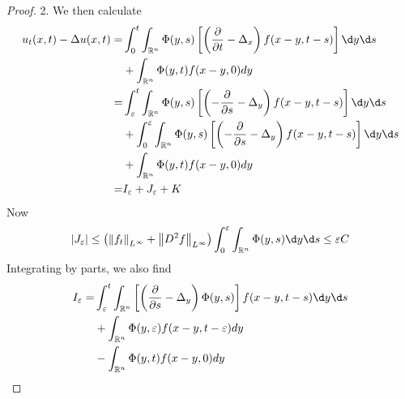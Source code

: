 \begin{theorem}
\begin{proof}
        2. We then calculate
        \begin{equation*}
            \begin{aligned}
                u_t(x, t)-\Delta u(x, t)= & \int_0^t \int_{\mathbb{R}^n} \Phi(y, s)\left[\left(\frac{\partial}{\partial t}-\Delta_x\right) f(x-y, t-s)\right] \d y \d s               \\
                                          & +\int_{\mathbb{R}^n} \Phi(y, t) f(x-y, 0) d y                                                                                             \\
                =                         & \int_{\varepsilon}^t \int_{\mathbb{R}^n} \Phi(y, s)\left[\left(-\frac{\partial}{\partial s}-\Delta_y\right) f(x-y, t-s)\right] \d y \d s  \\
                                          & +\int_0^{\varepsilon} \int_{\mathbb{R}^n} \Phi(y, s)\left[\left(-\frac{\partial}{\partial s}-\Delta_y\right) f(x-y, t-s)\right] \d y \d s \\
                                          & +\int_{\mathbb{R}^n} \Phi(y, t) f(x-y, 0) d y                                                                                             \\
                =                         & I_{\varepsilon}+J_{\varepsilon}+K
            \end{aligned}
        \end{equation*}
        Now
        \begin{equation*}
            \left|J_{\varepsilon}\right| \leq\left(\left\|f_t\right\|_{L^{\infty}}+\left\|D^2 f\right\|_{L^{\infty}}\right) \int_0^{\varepsilon} \int_{\mathbb{R}^n} \Phi(y, s) \d y \d s \leq \varepsilon C
        \end{equation*}
        Integrating by parts, we also find
        \begin{equation*}
            \begin{aligned}
                I_{\varepsilon}= & \int_{\varepsilon}^t \int_{\mathbb{R}^n}\left[\left(\frac{\partial}{\partial s}-\Delta_y\right) \Phi(y, s)\right] f(x-y, t-s) \d y \d s \\
                                 & +\int_{\mathbb{R}^n} \Phi(y, \varepsilon) f(x-y, t-\varepsilon) d y                                                                     \\
                                 & -\int_{\mathbb{R}^n} \Phi(y, t) f(x-y, 0) d y                                                                                           \\

\end{aligned}
\end{equation*}
\end{proof}
\end{theorem}
